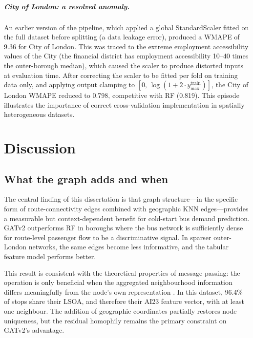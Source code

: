 \documentclass[12pt,a4paper]{report}
\begin{document}
\paragraph{City of London: a resolved anomaly.}
An earlier version of the pipeline, which applied a global StandardScaler
fitted on the full dataset before splitting (a data leakage error), produced
a WMAPE of 9.36 for City of London. This was traced to the extreme employment
accessibility values of the City (the financial district has employment
accessibility 10--40 times the outer-borough median), which caused the scaler
to produce distorted inputs at evaluation time. After correcting the scaler to
be fitted per fold on training data only, and applying output clamping to
$[0,\, \log(1 + 2 \cdot y_{\text{max}}^{\text{train}})]$, the City of London
WMAPE reduced to 0.798, competitive with RF (0.819). This episode illustrates
the importance of correct cross-validation implementation in spatially
heterogeneous datasets.


\chapter{Discussion}
\label{ch:discussion}

\section{What the graph adds and when}
The central finding of this dissertation is that graph structure---in the
specific form of route-connectivity edges combined with geographic KNN
edges---provides a measurable but context-dependent benefit for cold-start
bus demand prediction. GATv2 outperforms RF in boroughs where the bus
network is sufficiently dense for route-level passenger flow to be a
discriminative signal. In sparser outer-London networks, the same edges
become less informative, and the tabular feature model performs better.

This result is consistent with the theoretical properties of message passing:
the operation is only beneficial when the aggregated neighbourhood information
differs meaningfully from the node's own representation
\citep{hamilton2017inductive}. In this dataset, 96.4\% of stops share their
LSOA, and therefore their AI23 feature vector, with at least one neighbour.
The addition of geographic coordinates partially restores node uniqueness, but
the residual homophily remains the primary constraint on GATv2's advantage.
\end{document}
